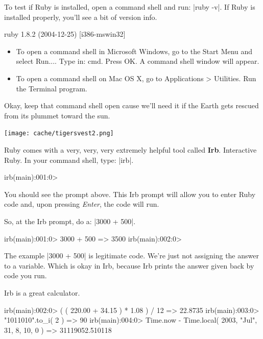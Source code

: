 \documentclass[12pt,twoside]{report}
\begin{document}
  To test if Ruby is installed, open a command shell and
run: \consoleinline|ruby -v|. If Ruby is installed
properly, you'll see a bit of version info.

\begin{consolecode}
 ruby 1.8.2 (2004-12-25) [i386-mswin32]
\end{consolecode}

\begin{itemize}

\item To open a command shell in Microsoft Windows, go to the Start Menu
and select Run.... Type in: cmd. Press OK. A command shell window will
appear.

\item To open a command shell on Mac OS X, go to Applications >
Utilities. Run the Terminal program.

\end{itemize}

Okay, keep that command shell open cause we'll need it if the Earth
gets rescued from its plummet toward the sun.

\newpage
\texttt{[image: cache/tigersvest2.png]}

Ruby comes with a very, very, very extremely helpful tool called
\textbf{Irb}. Interactive Ruby. In your command shell, type: 
\consoleinline|irb|.

\begin{consolecode}
 irb(main):001:0>
\end{consolecode}

You should see the prompt above. This Irb prompt will allow you to
enter Ruby code and, upon pressing \emph{Enter}, the code will run.

So, at the Irb prompt, do a: \consoleinline|3000 + 500|.

\begin{consolecode}
 irb(main):001:0> 3000 + 500
 => 3500
 irb(main):002:0>
\end{consolecode}

The example \consoleinline|3000 + 500| is legitimate
code. We're just not assigning the answer to a variable. Which is okay
in Irb, because Irb prints the answer given back by code you run.

Irb is a great calculator.

\begin{consolecode}
 irb(main):002:0> ( ( 220.00 + 34.15 ) * 1.08 ) / 12 
 => 22.8735
 irb(main):003:0> "1011010".to_i( 2 )
 => 90
 irb(main):004:0> Time.now - Time.local( 2003, "Jul", 31, 8, 10, 0 )
 => 31119052.510118
\end{consolecode}
\end{document}
